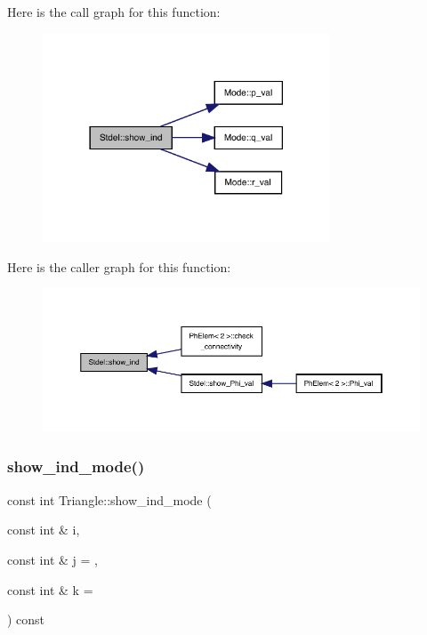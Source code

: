 Here is the call graph for this function\+:
\nopagebreak
\begin{figure}[H]
\begin{center}
\leavevmode
\includegraphics[width=242pt]{classStdel_a20afd536025caf1aad1c4e3f41fcb866_cgraph}
\end{center}
\end{figure}
Here is the caller graph for this function\+:
\nopagebreak
\begin{figure}[H]
\begin{center}
\leavevmode
\includegraphics[width=350pt]{classStdel_a20afd536025caf1aad1c4e3f41fcb866_icgraph}
\end{center}
\end{figure}
\mbox{\label{classTriangle_ac61acf91a02fd588a70bf75d3e246129}} 
\subsubsection{\texorpdfstring{show\+\_\+ind\+\_\+mode()}{show\_ind\_mode()}}
{\footnotesize\ttfamily const int Triangle\+::show\+\_\+ind\+\_\+mode (\begin{DoxyParamCaption}\item[{const int \&}]{i,  }\item[{const int \&}]{j = {},  }\item[{const int \&}]{k = {} }\end{DoxyParamCaption}) const\hspace{0.3cm}{\ttfamily [virtual]}}




